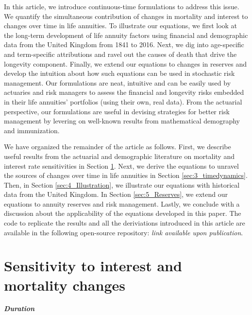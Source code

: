 \documentclass[12pt]{article}
\begin{document}
In this article, we introduce continuous-time formulations to address this issue. We quantify the simultaneous contribution of changes in mortality and interest to changes over time in life annuities. To illustrate our equations, we first look at the long-term development of life annuity factors using financial and demographic data from the United Kingdom from 1841 to 2016. Next, we dig into age-specific and term-specific attributions and ravel out the causes of death that drive the longevity component. Finally, we extend our equations to changes in reserves and develop the intuition about how such equations can be used in stochastic risk management. Our formulations are neat, intuitive and can be easily used by actuaries and risk managers to assess the financial and longevity risks embedded in their life annuities' portfolios (using their own, real data). From the actuarial perspective, our formulations are useful in devising strategies for better risk management by levering on well-known results from mathematical demography and immunization.


We have organized the remainder of the article as follows. First, we describe useful results from the actuarial and demographic literature on mortality and interest rate sensitivities in Section \ref{sec:2_Sensitivity}. Next, we derive the equations to unravel the sources of changes over time in life annuities in Section \ref{sec:3_timedynamics}. Then, in Section \ref{sec:4_Illustration}, we illustrate our equations with historical data from the United Kingdom. In Section \ref{sec:5_Reserves}, we extend our equations to annuity reserves and risk management. Lastly, we conclude with a discussion about the applicability of the equations developed in this paper. The code to replicate the results and all the deriviations introduced in this article are available in the following open-source repository: \textit{link available upon publication}.



\section{Sensitivity to interest and mortality changes}\label{sec:2_Sensitivity}

\textit{\textbf{Duration}}
\end{document}
